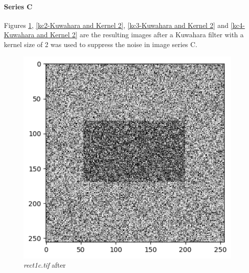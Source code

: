 \documentclass[runningheads]{llncs}
\begin{document}
\paragraph*{\textbf{Series C}}
Figures \ref{kc1-Kuwahara and Kernel 2}, \ref{kc2-Kuwahara and Kernel 2}, \ref{kc3-Kuwahara and Kernel 2} and \ref{kc4-Kuwahara and Kernel 2} are the resulting images after a Kuwahara filter with a kernel size of 2 was used to suppress the noise in image series C. 
\begin{figure}[h!]
\begin{minipage}[h]{0.47\linewidth}
\begin{center}
\includegraphics[width=1\linewidth]{Report/Result_Images/image_kc1.png} 
\caption{\emph{rect1c.tif} after}
\label{kc1-Kuwahara and Kernel 2}
\end{center} 
\end{minipage}
\hfill
\vspace{0.2 cm}
\begin{minipage}[h]{0.47\linewidth}
\begin{center}

\end{center}
\end{minipage}
\end{figure}
\end{document}
